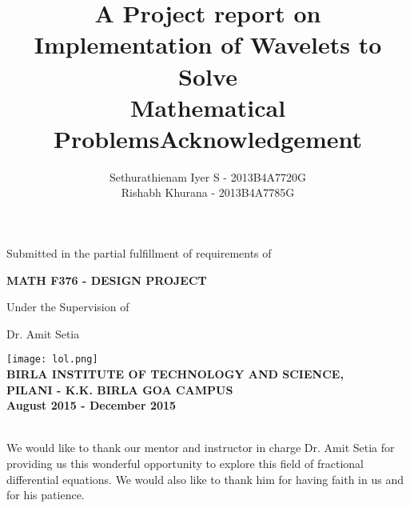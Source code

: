 \documentclass[12pt]{article}
\begin{document}
\title{ A Project report on \\ \textbf{Implementation of Wavelets to Solve \\ Mathematical Problems}}
\author { Sethurathienam Iyer S  - 2013B4A7720G\\ Rishabh Khurana - 2013B4A7785G}
\date{}
\maketitle

\hspace{0.9cm}\fontsize{12}{15}\selectfont Submitted in the partial fulfillment of requirements of  \\  \vspace{0.3cm}

  \hspace{2cm}\textbf{MATH F376 - DESIGN PROJECT}  \vspace{0.3cm}
  
  \hspace{3cm} Under the Supervision of \vspace{0.3cm}
  
  \hspace{3.8cm} Dr. Amit Setia \vspace{0.2cm}
   
   
\hspace{1.2cm} \texttt{[image: lol.png]}\\ 
\hspace{2.5cm}\textbf{ \centering BIRLA INSTITUTE OF TECHNOLOGY AND SCIENCE,\\
\hspace{0.5cm} PILANI - K.K. BIRLA GOA CAMPUS \\ 
\hspace{3.5cm} August 2015 - December 2015}
 
 \newpage
 \fontsize{12}{18}\selectfont
 \tableofcontents
 
 \newpage
 \normalsize
 \raggedright
 \hspace{3.5cm}\title{\textbf{\huge{Acknowledgement}}} \vspace{0.5cm} \\
We would like to thank our mentor and instructor in charge Dr. Amit Setia for providing us this wonderful opportunity to explore this field of fractional differential equations. We would also like to thank him for having faith in us and for his patience. \\
\end{document}
